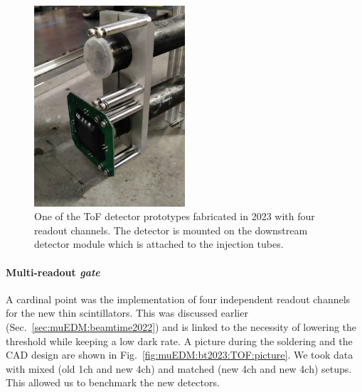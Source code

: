 \begin{refsection}
        \begin{figure}
            \centering
            \includegraphics[width=0.5\textwidth]{Figures/muEDM_Dec2023/IMG_20231209_225342Small.png}
            \caption[muEDM 2023: TOF mounting]{One of the ToF detector prototypes fabricated in 2023 with four readout channels. The detector is mounted on the downstream detector module which is attached to the injection tubes.}
            \label{fig:TB2023ToFPhoto}
        \end{figure}

        \paragraph{Multi-readout \textit{gate}}
        A cardinal point was the implementation of four independent readout channels for the new thin scintillators. 
        This was discussed earlier (Sec.~\ref{sec:muEDM:beamtime2022}) and is linked to the necessity of lowering the threshold while keeping a low dark rate.
        A picture during the soldering and the CAD design are shown in Fig.~\ref{fig:muEDM:bt2023:TOF:picture}.
        We took data with mixed (old 1ch and new 4ch) and matched (new 4ch and new 4ch) setups.
        This allowed us to benchmark the new detectors.
        

\end{refsection}
